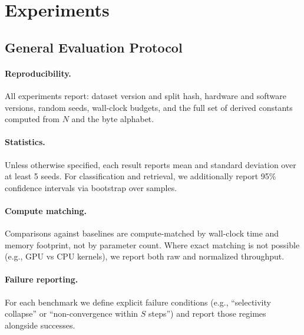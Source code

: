 \documentclass[11pt,a4paper]{article}
\begin{document}




\section{Experiments}
\label{sec:experiments}

\subsection{General Evaluation Protocol}
\label{sec:eval_protocol}

\paragraph{Reproducibility.}
All experiments report: dataset version and split hash, hardware and software versions, random seeds, wall-clock budgets, and the full set of derived constants computed from $N$ and the byte alphabet.

\paragraph{Statistics.}
Unless otherwise specified, each result reports mean and standard deviation over at least 5 seeds. For classification and retrieval, we additionally report 95\% confidence intervals via bootstrap over samples.

\paragraph{Compute matching.}
Comparisons against baselines are compute-matched by wall-clock time and memory footprint, not by parameter count. Where exact matching is not possible (e.g., GPU vs CPU kernels), we report both raw and normalized throughput.

\paragraph{Failure reporting.}
For each benchmark we define explicit failure conditions (e.g., ``selectivity collapse'' or ``non-convergence within $S$ steps'') and report those regimes alongside successes.
\end{document}
